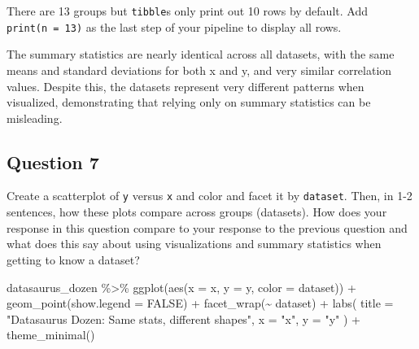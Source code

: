 \documentclass[
  letterpaper,
  DIV=11,
  numbers=noendperiod]{scrartcl}
\newenvironment{Shaded}{\begin{snugshade}}{\end{snugshade}}
\newcommand{\AttributeTok}[1]{\textcolor[rgb]{0.40,0.45,0.13}{#1}}
\newcommand{\ConstantTok}[1]{\textcolor[rgb]{0.56,0.35,0.01}{#1}}
\newcommand{\FunctionTok}[1]{\textcolor[rgb]{0.28,0.35,0.67}{#1}}
\newcommand{\NormalTok}[1]{\textcolor[rgb]{0.00,0.23,0.31}{#1}}
\newcommand{\SpecialCharTok}[1]{\textcolor[rgb]{0.37,0.37,0.37}{#1}}
\newcommand{\StringTok}[1]{\textcolor[rgb]{0.13,0.47,0.30}{#1}}
\begin{document}
\begin{tcolorbox}[enhanced jigsaw, coltitle=black, colbacktitle=quarto-callout-tip-color!10!white, colframe=quarto-callout-tip-color-frame, breakable, leftrule=.75mm, bottomtitle=1mm, left=2mm, opacityback=0, toptitle=1mm, titlerule=0mm, bottomrule=.15mm, title=\textcolor{quarto-callout-tip-color}{\faLightbulb}\hspace{0.5em}{Tip}, arc=.35mm, colback=white, opacitybacktitle=0.6, rightrule=.15mm, toprule=.15mm]

There are 13 groups but \texttt{tibble}s only print out 10 rows by
default. Add \texttt{print(n\ =\ 13)} as the last step of your pipeline
to display all rows.

\end{tcolorbox}

The summary statistics are nearly identical across all datasets, with
the same means and standard deviations for both x and y, and very
similar correlation values. Despite this, the datasets represent very
different patterns when visualized, demonstrating that relying only on
summary statistics can be misleading.

\subsection{Question 7}\label{question-7}

Create a scatterplot of \texttt{y} versus \texttt{x} and color and facet
it by \texttt{dataset}. Then, in 1-2 sentences, how these plots compare
across groups (datasets). How does your response in this question
compare to your response to the previous question and what does this say
about using visualizations and summary statistics when getting to know a
dataset?

\begin{Shaded}
\begin{Highlighting}[]
\NormalTok{datasaurus\_dozen }\SpecialCharTok{\%\textgreater{}\%}
  \FunctionTok{ggplot}\NormalTok{(}\FunctionTok{aes}\NormalTok{(}\AttributeTok{x =}\NormalTok{ x, }\AttributeTok{y =}\NormalTok{ y, }\AttributeTok{color =}\NormalTok{ dataset)) }\SpecialCharTok{+}
  \FunctionTok{geom\_point}\NormalTok{(}\AttributeTok{show.legend =} \ConstantTok{FALSE}\NormalTok{) }\SpecialCharTok{+}
  \FunctionTok{facet\_wrap}\NormalTok{(}\SpecialCharTok{\textasciitilde{}}\NormalTok{ dataset) }\SpecialCharTok{+}
  \FunctionTok{labs}\NormalTok{(}
    \AttributeTok{title =} \StringTok{"Datasaurus Dozen: Same stats, different shapes"}\NormalTok{,}
    \AttributeTok{x =} \StringTok{"x"}\NormalTok{,}
    \AttributeTok{y =} \StringTok{"y"}
\NormalTok{  ) }\SpecialCharTok{+}
  \FunctionTok{theme\_minimal}\NormalTok{()}
\end{Highlighting}
\end{Shaded}
\end{document}

